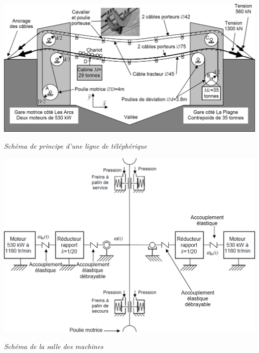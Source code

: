 \documentclass[10pt]{article}
\begin{document}
\begin{minipage}[c]{.49\linewidth}
\begin{center}
\includegraphics[width=\textwidth]{images/Schema_01}

\textit{Schéma de principe d'une ligne de téléphérique}
\end{center}
\end{minipage} \hfill
\begin{minipage}[c]{.49\linewidth}
\begin{center}
\includegraphics[width=\textwidth]{images/Schema_02}

\textit{Schéma de la salle des machines}
\end{center}
\end{minipage}
\vspace{.25cm}
\end{document}
